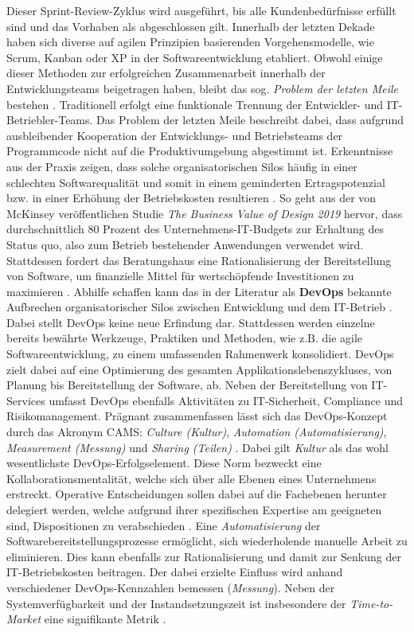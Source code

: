Dieser Sprint-Review-Zyklus wird ausgeführt, bis alle Kundenbedürfnisse erfüllt sind und das Vorhaben als abgeschlossen gilt.
Innerhalb der letzten Dekade haben sich diverse auf agilen Prinzipien basierenden Vorgehensmodelle, wie Scrum, Kanban oder \ac{XP} in der Softwareentwicklung etabliert. Obwohl einige dieser Methoden zur erfolgreichen Zusammenarbeit innerhalb der Entwicklungsteams beigetragen haben, bleibt das sog.  \textit{Problem der letzten Meile} bestehen \cite{Qentelli.20230305}. Traditionell erfolgt eine funktionale Trennung der Entwickler- und IT-Betriebler-Teams. Das Problem der letzten Meile beschreibt dabei, dass aufgrund ausbleibender Kooperation der Entwicklungs- und Betriebsteams der Programmcode nicht auf die Produktivumgebung abgestimmt ist. Erkenntnisse aus der Praxis zeigen, dass solche organisatorischen Silos häufig in einer schlechten Softwarequalität und somit in einem geminderten Ertragspotenzial bzw. in einer Erhöhung der Betriebskosten resultieren \cite[1]{Halstenberg.2020}. So geht aus der von McKinsey veröffentlichen Studie \textit{The Business Value of Design 2019} hervor, dass durchschnittlich 80 Prozent des Unternehmens-IT-Budgets zur Erhaltung des Status quo, also zum Betrieb bestehender Anwendungen verwendet wird. Stattdessen fordert das Beratungshaus eine Rationalisierung der Bereitstellung von Software, um finanzielle Mittel für wertschöpfende Investitionen zu maximieren \cite{.20230305}. Abhilfe schaffen kann das in der Literatur als \textbf{\ac{DevOps}} bekannte Aufbrechen organisatorischer Silos zwischen Entwicklung und dem IT-Betrieb \cite[1]{Halstenberg.2020}. 
Dabei stellt DevOps keine neue Erfindung dar. Stattdessen werden einzelne bereits bewährte Werkzeuge, Praktiken und Methoden, wie z.B. die agile Softwareentwicklung, zu einem umfassenden Rahmenwerk konsolidiert. DevOps zielt dabei auf eine Optimierung des gesamten Applikationslebenszykluses, von Planung bis Bereitstellung der Software, ab. Neben der Bereitstellung von IT-Services umfasst DevOps ebenfalls Aktivitäten zu IT-Sicherheit, Compliance und Risikomanagement. Prägnant zusammenfassen lässt sich das DevOps-Konzept durch das Akronym CAMS: \textit{Culture (Kultur)}, \textit{Automation (Automatisierung)}, \textit{Measurement (Messung)} und \textit{Sharing (Teilen)} \cite[5]{Halstenberg.2020}. Dabei gilt \textit{Kultur} als das wohl wesentlichste DevOps-Erfolgselement. Diese Norm bezweckt eine Kollaborationsmentalität, welche sich über alle Ebenen eines Unternehmens erstreckt. Operative Entscheidungen sollen dabei auf die Fachebenen herunter delegiert werden, welche aufgrund ihrer spezifischen Expertise am geeigneten sind, Dispositionen zu verabschieden \cite[5]{Halstenberg.2020}. Eine \textit{Automatisierung} der Softwarebereitstellungsprozesse ermöglicht, sich wiederholende manuelle Arbeit zu eliminieren. Dies kann ebenfalls zur Rationalisierung und damit zur Senkung der IT-Betriebskosten beitragen. Der dabei erzielte Einfluss wird anhand verschiedener DevOps-Kennzahlen bemessen (\textit{Messung}). Neben der Systemverfügbarkeit und der Instandsetzungszeit ist insbesondere der \textit{Time-to-Market} eine signifikante Metrik \cite[7]{Halstenberg.2020}. 

